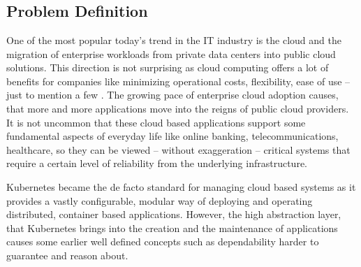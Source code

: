 \chapter{\bevezetes}

\section{Problem Definition}

One of the most popular today's trend in the IT industry is the cloud and the migration of enterprise workloads from private data centers into public cloud solutions. This direction is not surprising as cloud computing offers a lot of benefits for companies like minimizing operational costs, flexibility, ease of use -- just to mention a few \cite{CloudComputingStatistics}. The growing pace of enterprise cloud adoption causes, that more and more applications move into the reigns of public cloud providers. It is not uncommon that these cloud based applications support some fundamental aspects of everyday life like online banking, telecommunications, healthcare, so they can be viewed -- without exaggeration -- critical systems that require a certain level of reliability from the underlying infrastructure.

Kubernetes became the de facto standard for managing cloud based systems as it provides a vastly configurable, modular way of deploying and operating distributed, container based applications. However, the high abstraction layer, that Kubernetes brings into the creation and the maintenance of applications causes some earlier well defined concepts such as dependability harder to guarantee and reason about.


